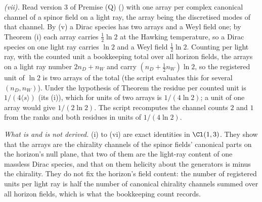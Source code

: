 \emph{(vii).} Read version 3 of Premise (Q) () with one array per complex canonical channel of a spinor field on a light ray, the array being the discretised modes of that channel. By (v) a Dirac species has two arrays and a Weyl field one; by Theorem (i) each array carries $\tfrac12\ln 2$ at the Hawking temperature, so a Dirac species on one light ray carries $\ln 2$ and a Weyl field $\tfrac12\ln 2$. Counting per light ray, with the counted unit a bookkeeping total over all horizon fields, the arrays on a light ray number $2n_{D} + n_{W}$ and carry $(n_{D} + \tfrac12 n_{W})\ln 2$, so the registered unit of $\ln 2$ is two arrays of the total (the script evaluates this for several $(n_{D}, n_{W})$). Under the hypothesis of Theorem  the residue per counted unit is $1/(4\langle s\rangle)$ (its (i)), which for units of two arrays is $1/(4\ln 2)$; a unit of one array would give $1/(2\ln 2)$. The script recomputes the channel counts $2$ and $1$ from the ranks and both residues in units of $1/(4\ln 2)$.

\emph{What is and is not derived.} (i) to (vi) are exact identities in $\Cl(1,3)$. They show that the arrays are the chirality channels of the spinor fields' canonical parts on the horizon's null plane, that two of them are the light-ray content of one massless Dirac species, and that on them helicity about the generators is minus the chirality. They do not fix the horizon's field content: the number of registered units per light ray is half the number of canonical chirality channels summed over all horizon fields, which is what the bookkeeping count records.
